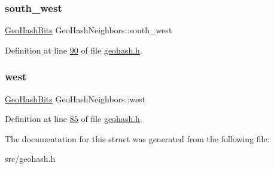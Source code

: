 \mbox{\label{structGeoHashNeighbors_ab8bb4c2079e664df04ff8dcbb247f87f}} 
\subsubsection{\texorpdfstring{south\+\_\+west}{south\_west}}
{\footnotesize\ttfamily \hyperlink{structGeoHashBits}{Geo\+Hash\+Bits} Geo\+Hash\+Neighbors\+::south\+\_\+west}



Definition at line \hyperlink{geohash_8h_source_l00090}{90} of file \hyperlink{geohash_8h_source}{geohash.\+h}.

\mbox{\label{structGeoHashNeighbors_a6757af24e2f4d2f855ed1492581b7f22}} 
\subsubsection{\texorpdfstring{west}{west}}
{\footnotesize\ttfamily \hyperlink{structGeoHashBits}{Geo\+Hash\+Bits} Geo\+Hash\+Neighbors\+::west}



Definition at line \hyperlink{geohash_8h_source_l00085}{85} of file \hyperlink{geohash_8h_source}{geohash.\+h}.



The documentation for this struct was generated from the following file\+:\begin{DoxyCompactItemize}
\item 
src/geohash.\+h\end{DoxyCompactItemize}
